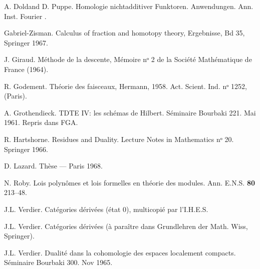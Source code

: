 \documentclass[10pt]{../fichiers-configuration-latex/smfart}
\begin{document}
\begin{thebibliography}{}
 A. Dold\pageoriginale  and D. Puppe. Homologie nicht\sisi{ }{-}additiver
Funktoren. Anwendungen. Ann. Inst. Fourier .

 Gabriel-Zisman. Calculus of fraction and homotopy
theory, Ergebnisse, Bd 35, Springer 1967.

 J. Giraud. Méthode de la descente, Mémoire nᵒ 2 de la Société Mathématique de France (1964).

 R. Godement. Théorie des faisceaux, Hermann,
1958. Act. Scient. Ind. nᵒ 1252, (Paris).

 A. Grothendieck. TDTE IV: les schémas de
Hilbert. Séminaire Bourbaki 221. Mai 1961. Repris dans FGA.

 R. Hartshorne. Residues and Duality. Lecture Notes
in Mathematics nᵒ 20. Springer 1966.

 D. Lazard. Thèse --- Paris 1968.



 N. Roby. Lois polynômes et lois formelles en théorie
des modules. Ann. E.N.S. \textbf{80} 213--48.

 J.L. Verdier. Catégories dérivées (état 0),
multicopié par l'I.H.E.S.

 J.L. Verdier. Catégories dérivées (à paraître dans
Grundlehren der Math. Wiss, Springer).

 J.L. Verdier. Dualité dans la cohomologie des
espaces localement compacts. Séminaire Bourbaki 300. Nov 1965.
\end{thebibliography}




\ifx\danslelivre\undefined
\end{document}
